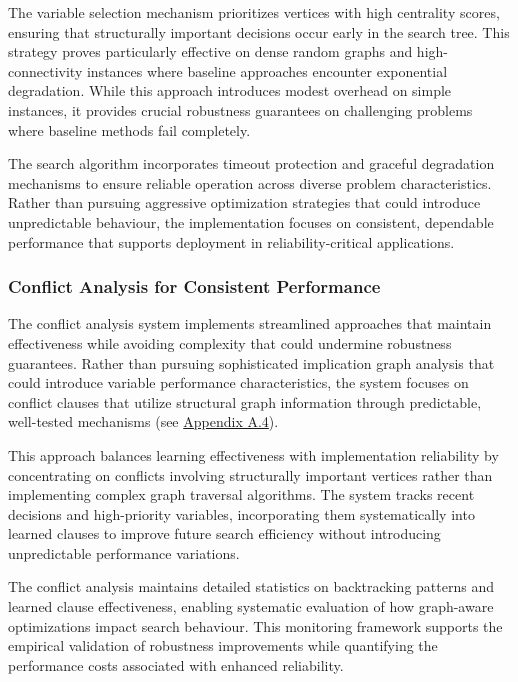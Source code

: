 The variable selection mechanism prioritizes vertices with high centrality scores, ensuring that structurally important decisions occur early in the search tree. This strategy proves particularly effective on dense random graphs and high-connectivity instances where baseline approaches encounter exponential degradation. While this approach introduces modest overhead on simple instances, it provides crucial robustness guarantees on challenging problems where baseline methods fail completely.

The search algorithm incorporates timeout protection and graceful degradation mechanisms to ensure reliable operation across diverse problem characteristics. Rather than pursuing aggressive optimization strategies that could introduce unpredictable behaviour, the implementation focuses on consistent, dependable performance that supports deployment in reliability-critical applications.

\subsubsection{Conflict Analysis for Consistent Performance}

The conflict analysis system implements streamlined approaches that maintain effectiveness while avoiding complexity that could undermine robustness guarantees. Rather than pursuing sophisticated implication graph analysis that could introduce variable performance characteristics, the system focuses on conflict clauses that utilize structural graph information through predictable, well-tested mechanisms (see \hyperref[appendix:conflict-analysis]{Appendix A.4}).

This approach balances learning effectiveness with implementation reliability by concentrating on conflicts involving structurally important vertices rather than implementing complex graph traversal algorithms. The system tracks recent decisions and high-priority variables, incorporating them systematically into learned clauses to improve future search efficiency without introducing unpredictable performance variations.

The conflict analysis maintains detailed statistics on backtracking patterns and lear\-ned clause effectiveness, enabling systematic evaluation of how graph-aware optimizations impact search behaviour. This monitoring framework supports the empirical validation of robustness improvements while quantifying the performance costs associated with enhanced reliability.

